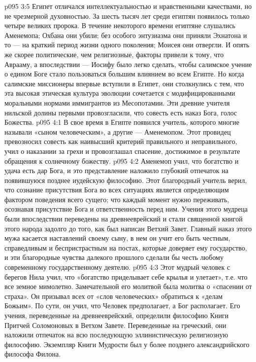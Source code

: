 \vs p095 3:5 \pc Египет отличался интеллектуальностью и нравственными качествами, но не чрезмерной духовностью. За шесть тысяч лет среди египтян появилось только четыре великих пророка. В течение некоторого времени египтяне слушались Аменемопа; Охбана они убили; без особого энтузиазма они приняли Эхнатона и то --- на краткий период жизни одного поколения; Моисея они отвергли. И опять же скорее политические, чем религиозные, факторы привели к тому, что Аврааму, а впоследствии --- Иосифу было легко сделать, чтобы салимское учение о едином Боге стало пользоваться большим влиянием во всем Египте. Но когда салимские миссионеры впервые вступили в Египет, они столкнулись с тем, что эта высокая этическая культура эволюции сочетается с модифицированными моральными нормами иммигрантов из Месопотамии. Эти древние учителя нильской долины первыми провозгласили, что совесть есть наказ Бога, голос Божества.
\vs p095 4:1 В свое время в Египте появился учитель, которого многие называли «сыном человеческим», а другие --- Аменемопом. Этот провидец превозносил совесть как наивысший критерий правильного и неправильного, учил о наказании за грехи и провозглашал спасение, достижимое в результате обращения к солнечному божеству.
\vs p095 4:2 Аменемоп учил, что богатство и удача есть дар Бога, и это представление наложило глубокий отпечаток на появившуюся позднее иудейскую философию. Этот благородный учитель верил, что сознание присутствия Бога во всех ситуациях является определяющим фактором поведения всего сущего; что каждый момент нужно переживать, осознавая присутствие Бога и ответственность перед ним. Учения этого мудреца были впоследствии переведены на древнееврейский и стали священной книгой этого народа задолго до того, как был написан Ветхий Завет. Главный наказ этого мужа касается наставлений своему сыну, в нем он учит его быть честным, справедливым и беспристрастным на постах, которые доверяет ему государство, и эти благородные чувства далекого прошлого сделали бы честь любому современному государственному деятелю.
\vs p095 4:3 Этот мудрый человек с берегов Нила учил, что «богатство приделывает себе крылья и улетает», т.е. что все земное мимолетно. Замечательной его молитвой была молитва о «спасении от страха». Он призывал всех от «слов человеческих» обратиться к «делам Божьим». По сути, он учил, что Человек предполагает, а Бог располагает. Его учения, переведенные на древнееврейский, определили философию Книги Притчей Соломоновых в Ветхом Завете. Переведенные на греческий, они наложили отпечаток на всю последующую эллинистическую религиозную философию. Экземпляр Книги Мудрости был у более позднего александрийского философа Филона.
